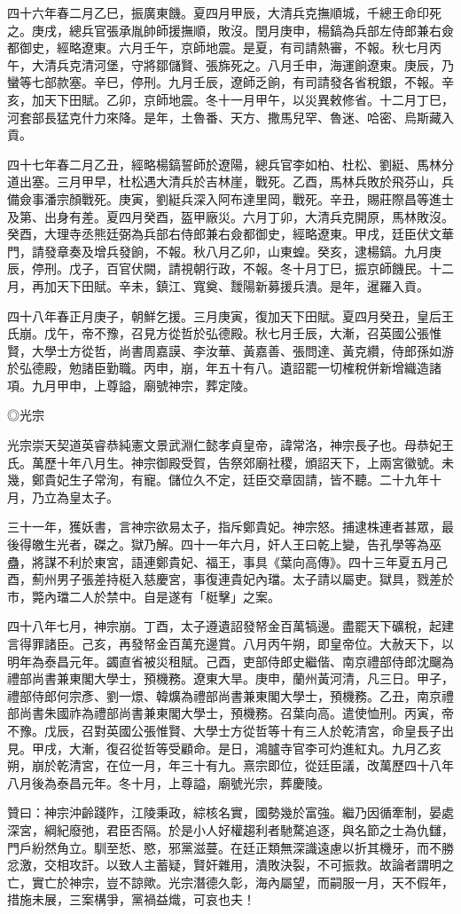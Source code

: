 \begin{pinyinscope}
四十六年春二月乙巳，振廣東饑。夏四月甲辰，大清兵克撫順城，千總王命印死之。庚戌，總兵官張承胤帥師援撫順，敗沒。閏月庚申，楊鎬為兵部左侍郎兼右僉都御史，經略遼東。六月壬午，京師地震。是夏，有司請熱審，不報。秋七月丙午，大清兵克清河堡，守將鄒儲賢、張旆死之。八月壬申，海運餉遼東。庚辰，乃蠻等七部款塞。辛巳，停刑。九月壬辰，遼師乏餉，有司請發各省稅銀，不報。辛亥，加天下田賦。乙卯，京師地震。冬十一月甲午，以災異敕修省。十二月丁巳，河套部長猛克什力來降。是年，土魯番、天方、撒馬兒罕、魯迷、哈密、烏斯藏入貢。

四十七年春二月乙丑，經略楊鎬誓師於遼陽，總兵官李如柏、杜松、劉綎、馬林分道出塞。三月甲早，杜松遇大清兵於吉林崖，戰死。乙酉，馬林兵敗於飛芬山，兵備僉事潘宗顏戰死。庚寅，劉綎兵深入阿布達里岡，戰死。辛丑，賜莊際昌等進士及第、出身有差。夏四月癸酉，盔甲廠災。六月丁卯，大清兵克開原，馬林敗沒。癸酉，大理寺丞熊廷弼為兵部右侍郎兼右僉都御史，經略遼東。甲戌，廷臣伏文華門，請發章奏及增兵發餉，不報。秋八月乙卯，山東蝗。癸亥，逮楊鎬。九月庚辰，停刑。戊子，百官伏闕，請視朝行政，不報。冬十月丁巳，振京師饑民。十二月，再加天下田賦。辛未，鎮江、寬奠、靉陽新募援兵潰。是年，暹羅入貢。

四十八年春正月庚子，朝鮮乞援。三月庚寅，復加天下田賦。夏四月癸丑，皇后王氏崩。戊午，帝不豫，召見方從哲於弘德殿。秋七月壬辰，大漸，召英國公張惟賢，大學士方從哲，尚書周嘉謨、李汝華、黃嘉善、張問達、黃克纘，侍郎孫如游於弘德殿，勉諸臣勤職。丙申，崩，年五十有八。遺詔罷一切榷稅併新增織造諸項。九月甲申，上尊謚，廟號神宗，葬定陵。

◎光宗

光宗崇天契道英睿恭純憲文景武淵仁懿孝貞皇帝，諱常洛，神宗長子也。母恭妃王氏。萬歷十年八月生。神宗御殿受賀，告祭郊廟社稷，頒詔天下，上兩宮徽號。未幾，鄭貴妃生子常洵，有寵。儲位久不定，廷臣交章固請，皆不聽。二十九年十月，乃立為皇太子。

三十一年，獲妖書，言神宗欲易太子，指斥鄭貴妃。神宗怒。捕逮株連者甚眾，最後得皦生光者，磔之。獄乃解。四十一年六月，奸人王曰乾上變，告孔學等為巫蠱，將謀不利於東宮，語連鄭貴妃、福王，事具《葉向高傳》。四十三年夏五月己酉，薊州男子張差持梃入慈慶宮，事復連貴妃內璫。太子請以屬吏。獄具，戮差於市，斃內璫二人於禁中。自是遂有「梃擊」之案。

四十八年七月，神宗崩。丁酉，太子遵遺詔發帑金百萬犒邊。盡罷天下礦稅，起建言得罪諸臣。己亥，再發帑金百萬充邊賞。八月丙午朔，即皇帝位。大赦天下，以明年為泰昌元年。蠲直省被災租賦。己酉，吏部侍郎史繼偕、南京禮部侍郎沈飀為禮部尚書兼東閣大學士，預機務。遼東大旱。庚申，蘭州黃河清，凡三日。甲子，禮部侍郎何宗彥、劉一燝、韓爌為禮部尚書兼東閣大學士，預機務。乙丑，南京禮部尚書朱國祚為禮部尚書兼東閣大學士，預機務。召葉向高。遣使恤刑。丙寅，帝不豫。戊辰，召對英國公張惟賢、大學士方從哲等十有三人於乾清宮，命皇長子出見。甲戌，大漸，復召從哲等受顧命。是日，鴻臚寺官李可灼進紅丸。九月乙亥朔，崩於乾清宮，在位一月，年三十有九。熹宗即位，從廷臣議，改萬歷四十八年八月後為泰昌元年。冬十月，上尊謚，廟號光宗，葬慶陵。

贊曰：神宗沖齡踐阼，江陵秉政，綜核名實，國勢幾於富強。繼乃因循牽制，晏處深宮，綱紀廢弛，君臣否隔。於是小人好權趨利者馳騖追逐，與名節之士為仇讎，門戶紛然角立。馴至悊、愍，邪黨滋蔓。在廷正類無深識遠慮以折其機牙，而不勝忿激，交相攻訐。以致人主蓄疑，賢奸雜用，潰敗決裂，不可振救。故論者謂明之亡，實亡於神宗，豈不諒歟。光宗潛德久彰，海內屬望，而嗣服一月，天不假年，措施未展，三案構爭，黨禍益熾，可哀也夫！


\end{pinyinscope}